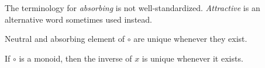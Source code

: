 \begin{terminology}
The terminology for \emph{absorbing} is not well-standardized.
\emph{Attractive} is an alternative word sometimes used instead.
\end{terminology}

\begin{theorem}\label{thm:math:binop}
Neutral and absorbing element of $\circ$ are unique whenever they exist.

If $\circ$ is a monoid, then the inverse of $x$ is unique whenever it exists.
\end{theorem}

